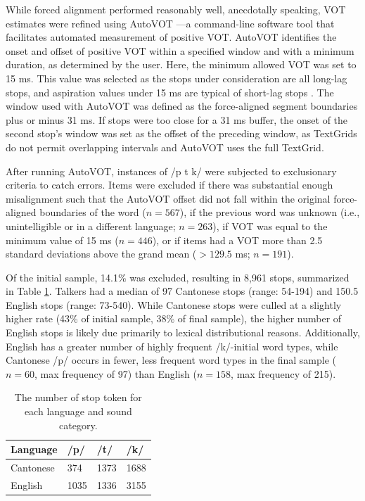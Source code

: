 While forced alignment performed reasonably well, anecdotally speaking, VOT estimates were refined using AutoVOT \citep{keshet_2014_autovot}---a command-line software tool that facilitates automated measurement of positive VOT. AutoVOT identifies the onset and offset of positive VOT within a specified window and with a minimum duration, as determined by the user. Here, the minimum allowed VOT was set to 15 ms. This value was selected as the stops under consideration are all long-lag stops, and aspiration values under 15 ms are typical of short-lag stops \citep{lieberman_1988_speech}. The window used with AutoVOT was defined as the force-aligned segment boundaries plus or minus 31 ms. If stops were too close for a 31 ms buffer, the onset of the second stop's window was set as the offset of the preceding window, as TextGrids do not permit overlapping intervals and AutoVOT uses the full TextGrid.  

After running AutoVOT, instances of /p t k/ were subjected to exclusionary criteria to catch errors. Items were excluded if there was substantial enough misalignment such that the AutoVOT offset did not fall within the original force-aligned boundaries of the word ($n=567$), if the previous word was unknown (i.e., unintelligible or in a different language; $n=263$), if VOT was equal to the minimum value of 15 ms ($n=446$), or if items had a VOT more than 2.5 standard deviations above the grand mean ($>129.5$ ms; $n=191$).

Of the initial sample, 14.1\% was excluded, resulting in 8,961 stops, summarized in Table \ref{ch3:tab:counts}. Talkers had a median of 97 Cantonese stops (range: 54-194) and 150.5 English stops (range: 73-540). While Cantonese stops were culled at a slightly higher rate (43\% of initial sample, 38\% of final sample), the higher number of English stops is likely due primarily to lexical distributional reasons. Additionally, English has a greater number of highly frequent /k/-initial word types, while Cantonese /p/ occurs in fewer, less frequent word types in the final sample ($n=60$, max frequency of 97) than English ($n=158$, max frequency of 215).

\begin{table}[htb]
  \caption{The number of stop token for each language and sound category.}
  \label{ch3:tab:counts}
  \centering
  \begin{tabular}{llll}
    \toprule
    \textbf{Language}  & \textbf{/p/} & \textbf{/t/} & \textbf{/k/} \\
    \midrule
    Cantonese & 374          & 1373         & 1688         \\
    English   & 1035         & 1336         & 3155   \\
    \bottomrule     
  \end{tabular}
\end{table}

